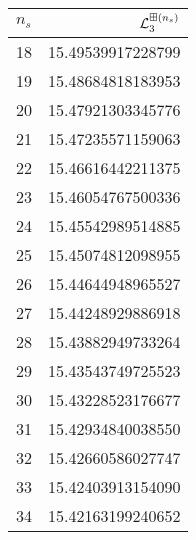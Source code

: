 \begin{tabular}[t]{|lr}
\toprule
  $n_{s}$ &  $\mathcal L^{\boxplus (n_s)}_3$ \\
\midrule
       18 &                   15.49539917228799 \\
       19 &                   15.48684818183953 \\
       20 &                   15.47921303345776 \\
       21 &                   15.47235571159063 \\
       22 &                   15.46616442211375 \\
       23 &                   15.46054767500336 \\
       24 &                   15.45542989514885 \\
       25 &                   15.45074812098955 \\
       26 &                   15.44644948965527 \\
       27 &                   15.44248929886918 \\
       28 &                   15.43882949733264 \\
       29 &                   15.43543749725523 \\
       30 &                   15.43228523176677 \\
       31 &                   15.42934840038550 \\
       32 &                   15.42660586027747 \\
       33 &                   15.42403913154090 \\
       34 &                   15.42163199240652 \\
\bottomrule
\end{tabular}
